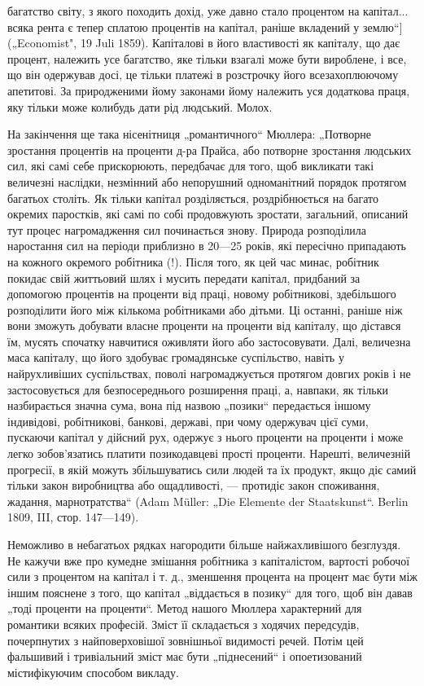 \parcont{}  %
багатство світу, з якого походить дохід, уже давно стало процентом
на капітал... всяка рента є тепер сплатою процентів на
капітал, раніше вкладений у землю“] („Economist", 19 Juli 1859).
Капіталові в його властивості як капіталу, що дає процент, належить
усе багатство, яке тільки взагалі може бути вироблене,
і все, що він одержував досі, це тільки платежі в розстрочку його
всезахоплюючому апетитові. За природженими йому законами
йому належить уся додаткова праця, яку тільки може колибудь
дати рід людський. Молох.

На закінчення ще така нісенітниця „романтичного“ Мюллера:
„Потворне зростання процентів на проценти д-ра Прайса, або
потворне зростання людських сил, які самі себе прискорюють,
передбачає для того, щоб викликати такі величезні наслідки,
незмінний або непорушний одноманітний порядок протягом багатьох
століть. Як тільки капітал розділяється, роздрібнюється
на багато окремих паростків, які самі по собі продовжують
зростати, загальний, описаний тут процес нагромадження сил
починається знову. Природа розподілила наростання сил на
періоди приблизно в 20—25 років, які пересічно припадають
на кожного окремого робітника (!). Після того, як цей час
минає, робітник покидає свій життьовий шлях і мусить передати
капітал, придбаний за допомогою процентів на проценти від
праці, новому робітникові, здебільшого розподілити його між
кількома робітниками або дітьми. Ці останні, раніше ніж вони
зможуть добувати власне проценти на проценти від капіталу,
що дістався їм, мусять спочатку навчитися оживляти його або
застосовувати. Далі, величезна маса капіталу, що його здобуває
громадянське суспільство, навіть у найрухливіших суспільствах,
поволі нагромаджується протягом довгих років і не
застосовується для безпосереднього розширення праці, а, навпаки,
як тільки назбирається значна сума, вона під назвою „позики“
передається іншому індивідові, робітникові, банкові, державі,
при чому одержувач цієї суми, пускаючи капітал у дійсний рух,
одержує з нього проценти на проценти і може легко зобов’язатись
платити позикодавцеві прості проценти. Нарешті, величезній
прогресії, в якій можуть збільшуватись сили людей та їх
продукт, якщо діє самий тільки закон виробництва або ощадливості,
— протидіє закон споживання, жадання, марнотратства“
(Adam Müller: „Die Elemente der Staatskunst“. Berlin 1809, III,
стор. 147—149).

Неможливо в небагатьох рядках нагородити більше найжахливішого
безглуздя. Не кажучи вже про кумедне змішання
робітника з капіталістом, вартості робочої сили з процентом
на капітал і т. д., зменшення процента на процент має бути
між іншим пояснене з того, що капітал „віддається в позику“ для
того, щоб він давав „тоді проценти на проценти“. Метод нашого
Мюллера характерний для романтики всяких професій. Зміст її
складається з ходячих передсудів, почерпнутих з найповерховішої
зовнішньої видимості речей. Потім цей фальшивий і тривіальний
зміст має бути „піднесений“ і опоетизований містифікуючим
способом викладу.

